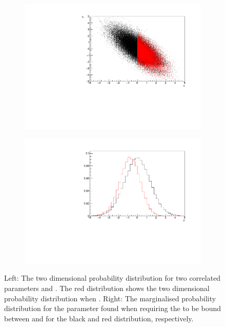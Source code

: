 \begin{figure}[h]
  \begin{subfigure}[t]{0.48\textwidth}
    \includegraphics[width=\textwidth, trim={0mm 0mm 0mm 0mm}, clip,page=1]{Figures/MCMC/MCTechnique_Marginalisation2D_Double_Correlations.pdf}
  \end{subfigure} %
    \begin{subfigure}[t]{0.48\textwidth}
    \includegraphics[width=\textwidth, trim={0mm 0mm 0mm 0mm}, clip,page=1]{Figures/MCMC/MCTechnique_Marginalisation1D_Double_Correlations.pdf}
  \end{subfigure}

  \caption{Left: The two dimensional probability distribution for two correlated parameters  and . The red distribution shows the two dimensional probability distribution when . Right: The marginalised probability distribution for the  parameter found when requiring the  to be bound between  and  for the black and red distribution, respectively.}
  \label{fig:MCMC_MCTechniqueMarginalisationProblems}
\end{figure}

